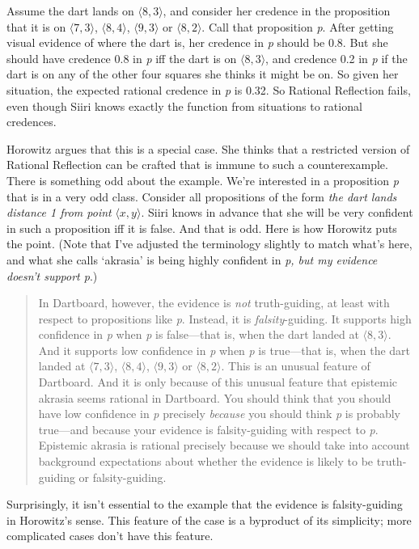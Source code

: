 Assume the dart lands on $\langle 8, 3 \rangle$, and consider her credence in the proposition that it is on $\langle 7, 3 \rangle$, $\langle 8, 4 \rangle$, $\langle 9, 3 \rangle$ or $\langle 8, 2 \rangle$. Call that proposition \emph{p}. After getting visual evidence of where the dart is, her credence in \emph{p} should be 0.8. But she should have credence 0.8 in \emph{p} iff the dart is on $\langle 8, 3 \rangle$, and credence 0.2 in \emph{p} if the dart is on any of the other four squares she thinks it might be on. So given her situation, the expected rational credence in \emph{p} is 0.32. So Rational Reflection fails, even though \gls{Siiri} knows exactly the function from situations to rational credences.

Horowitz argues that this is a special case. She thinks that a restricted version of Rational Reflection can be crafted that is immune to such a counterexample. There is something odd about the example. We're interested in a proposition \emph{p} that is in a very odd class. Consider all propositions of the form \emph{the dart lands distance 1 from point} $\langle x, y \rangle$. \gls{Siiri} knows in advance that she will be very confident in such a proposition iff it is false. And that is odd. Here is how Horowitz puts the point. (Note that I've adjusted the terminology slightly to match what's here, and what she calls `akrasia' is being highly confident in \emph{p, but my evidence doesn't support p}.)

\begin{quote}
In Dartboard, however, the evidence is \emph{not} truth-guiding, at least with respect to propositions like \emph{p}. Instead, it is \emph{falsity}-guiding. It supports high confidence in \emph{p} when \emph{p} is false—that is, when the dart landed at $\langle 8, 3 \rangle$. And it supports low confidence in \emph{p} when \emph{p} is true—that is, when the dart landed at $\langle 7, 3 \rangle$, $\langle 8, 4 \rangle$, $\langle 9, 3 \rangle$ or $\langle 8, 2 \rangle$. This is an unusual feature of Dartboard. And it is only because of this unusual feature that epistemic akrasia seems rational in Dartboard. You should think that you should have low confidence in \emph{p} precisely \emph{because} you should think \emph{p} is probably true—and because your evidence is falsity-guiding with respect to \emph{p}. Epistemic akrasia is rational precisely because we should take into account background expectations about whether the evidence is likely to be truth-guiding or falsity-guiding. ~\citep[738, notation altered, emphasis in original]{Horowitz2014}
\end{quote}
Surprisingly, it isn't essential to the example that the evidence is falsity-guiding in Horowitz's sense. This feature of the case is a byproduct of its simplicity; more complicated cases don't have this feature.

